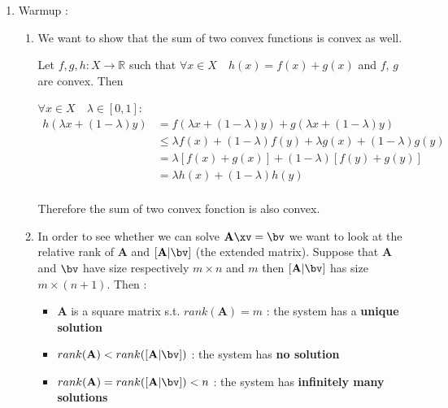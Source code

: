 \documentclass{./../../tex_import/ETHuebung_english}
\begin{document}


\begin{enumerate}
	

\item{Warmup :}
	\begin{enumerate}
		
		\item We want to show that the sum of two convex functions is convex as well.

		Let $f,g,h \colon X \to \mathbb{R}$ such that $\forall x \in X \quad h(x) = f(x) + g(x)$ and $f$, $g$ are convex. Then 
		
		$\forall x \in X \quad \lambda \in [0,1]$:
		\begin{equation*}
			\begin{split}
				h(\lambda x + (1-\lambda) y ) &= f(\lambda x + (1-\lambda) y ) + g(\lambda x + (1-\lambda) y )\\
				&\le \lambda f(x) + (1-\lambda)f(y) + \lambda g(x) + (1-\lambda)g(y)\\
				&= \lambda \left[f(x) +  g(x)\right] + (1-\lambda)\left[f(y) + g(y)\right]\\
				&= \lambda h(x) + (1-\lambda)h(y)\\
			\end{split}
		\end{equation*}
	
		Therefore the sum of two convex fonction is also convex.
		
		\item In order to see whether we can solve $\mathbf{A}\xv = \bv$ we want to look at the relative rank of $\mathbf{A}$ and $[\mathbf{A}|\bv]$ (the extended matrix). Suppose that $\mathbf{A}$ and $\bv$ have size respectively $m \times n$ and $m$ then $[\mathbf{A}|\bv]$ has size $m \times (n+1)$. Then :
			\begin{itemize}
				\item $\mathbf{A}$ is a square matrix s.t. $rank(\mathbf{A})=m$ : the system has a \textbf{unique solution} 
				\item $rank(\mathbf{A}) < rank([\mathbf{A}|\bv])$ : the system has \textbf{no solution} 					
				\item $rank(\mathbf{A}) = rank([\mathbf{A}|\bv]) < n$ : the system has \textbf{infinitely many solutions} 					
			\end{itemize}


\end{enumerate}
\end{enumerate}
\end{document}
